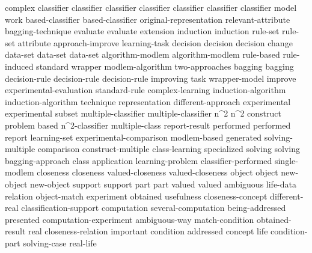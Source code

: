 complex	
classifier	classifier	classifier	classifier	classifier	classifier	classifier	
model	
work	
based-classifier	based-classifier	
original-representation	
relevant-attribute	
bagging-technique	
evaluate	evaluate	
extension	
induction	induction	
rule-set	rule-set	
attribute	
approach-improve	
learning-task	
decision	decision	decision	
change	
data-set	data-set	data-set	
algorithm-modlem	algorithm-modlem	
rule-based	
rule-induced	
standard	
wrapper	
modlem-algorithm	
two-approaches	
bagging	bagging	
decision-rule	decision-rule	decision-rule	
improving	
task	
wrapper-model	
improve	
experimental-evaluation	
standard-rule	
complex-learning	
induction-algorithm	induction-algorithm	
technique	
representation	
different-approach	
experimental	experimental	
subset	
multiple-classifier	multiple-classifier	
n^2	n^2	
construct	
problem	
based	
n^2-classifier	
multiple-class	
report-result	
performed	performed	
report	
learning-set	
experimental-comparison	
modlem-based	
generated	
solving-multiple	
comparison	
construct-multiple	
class-learning	
specialized	
solving	solving	
bagging-approach	
class	
application	
learning-problem	
classifier-performed	
single-modlem	
closeness	closeness	
valued-closeness	valued-closeness	
object	object	
new-object	new-object	
support	support	
part	part	
valued	valued	
ambiguous	
life-data	
relation	
object-match	
experiment	
obtained	
usefulness	
closeness-concept	
different-real	
classification-support	
computation	
several-computation	
being-addressed	
presented	
computation-experiment	
ambiguous-way	
match-condition	
obtained-result	
real	
closeness-relation	
important	
condition	
addressed	
concept	
life	
condition-part	
solving-case	
real-life	

